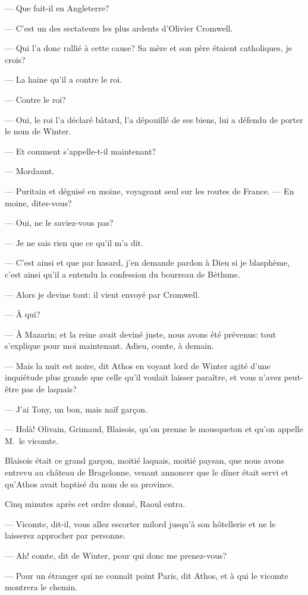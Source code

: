 — Que fait-il en Angleterre?

— C'est un des sectateurs les plus ardents d'Olivier Cromwell.

— Qui l'a donc rallié à cette cause? Sa mère et son père étaient catholiques, je crois?

— La haine qu'il a contre le roi.

— Contre le roi?

— Oui, le roi l'a déclaré bâtard, l'a dépouillé de ses biens, lui a défendu de porter le nom de Winter.

— Et comment s'appelle-t-il maintenant?

— Mordaunt.

— Puritain et déguisé en moine, voyageant seul sur les routes de France.
— En moine, dites-vous?

— Oui, ne le saviez-vous pas?

— Je ne sais rien que ce qu'il m'a dit.

— C'est ainsi et que par hasard, j'en demande pardon à Dieu si je blasphème, c'est ainsi qu'il a entendu la confession du bourreau de Béthune.

— Alors je devine tout: il vient envoyé par Cromwell.

— À qui?

— À Mazarin; et la reine avait deviné juste, nous avons été prévenus: tout s'explique pour moi maintenant. Adieu, comte, à demain.

— Mais la nuit est noire, dit Athos en voyant lord de Winter agité d'une inquiétude plus grande que celle qu'il voulait laisser paraître, et vous n'avez peut-être pas de laquais?

— J'ai Tony, un bon, mais naïf garçon.

— Holà! Olivain, Grimaud, Blaisois, qu'on prenne le mousqueton et qu'on appelle M.~le vicomte.

Blaisois était ce grand garçon, moitié laquais, moitié paysan, que nous avons entrevu au château de Bragelonne, venant annoncer que le dîner était servi et qu'Athos avait baptisé du nom de sa province.

Cinq minutes après cet ordre donné, Raoul entra.

— Vicomte, dit-il, vous allez escorter milord jusqu'à son hôtellerie et ne le laisserez approcher par personne.

— Ah! comte, dit de Winter, pour qui donc me prenez-vous?

— Pour un étranger qui ne connaît point Paris, dit Athos, et à qui le vicomte montrera le chemin.

